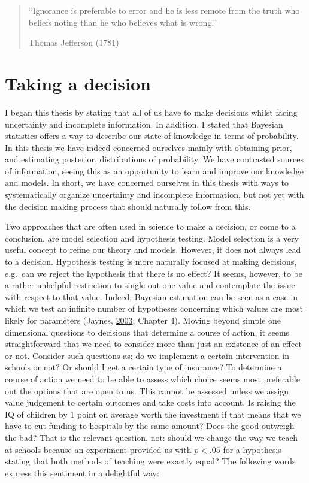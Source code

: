 \documentclass[openright,titlepage,12pt,a4paper]{book}
\begin{document}
\begin{quote}
``Ignorance is preferable to error and he is less remote from the truth who
beliefs noting than he who believes what is wrong.''

Thomas Jefferson (1781)
\end{quote}

\hypertarget{taking-a-decision}{%
\section{Taking a decision}\label{taking-a-decision}}

I began this thesis by stating that all of us have to make decisions whilst facing uncertainty and incomplete information. In addition, I stated that Bayesian statistics offers a way to describe our state of knowledge in terms of probability. In this thesis we have indeed concerned ourselves mainly with obtaining prior, and estimating posterior, distributions of probability. We have contrasted sources of information, seeing this as an opportunity to learn and improve our knowledge and models. In short, we have concerned ourselves in this thesis with ways to systematically organize uncertainty and incomplete information, but not yet with the decision making process that should naturally follow from this.

Two approaches that are often used in science to make a decision, or come to a conclusion, are model selection and hypothesis testing. Model selection is a very useful concept to refine our theory and models. However, it does not always lead to a decision. Hypothesis testing is more naturally focused at making decisions, e.g.~can we reject the hypothesis that there is no effect? It seems, however, to be a rather unhelpful restriction to single out one value and contemplate the issue with respect to that value. Indeed, Bayesian estimation can be seen as a case in which we test an infinite number of hypotheses concerning which values are most likely for parameters (Jaynes, \protect\hyperlink{ref-jaynes_probability_2003}{2003}, Chapter 4). Moving beyond simple one dimensional questions to decisions that determine a course of action, it seems straightforward that we need to consider more than just an existence of an effect or not. Consider such questions as; do we implement a certain intervention in schools or not? Or should I get a certain type of insurance? To determine a course of action we need to be able to assess which choice seems most preferable out the options that are open to us. This cannot be assessed unless we assign value judgement to certain outcomes and take costs into account. Is raising the IQ of children by 1 point on average worth the investment if that means that we have to cut funding to hospitals by the same amount? Does the good outweigh the bad? That is the relevant question, not: should we change the way we teach at schools because an experiment provided us with \(p<.05\) for a hypothesis stating that both methods of teaching were exactly equal? The following words express this sentiment in a delightful way:
\end{document}
